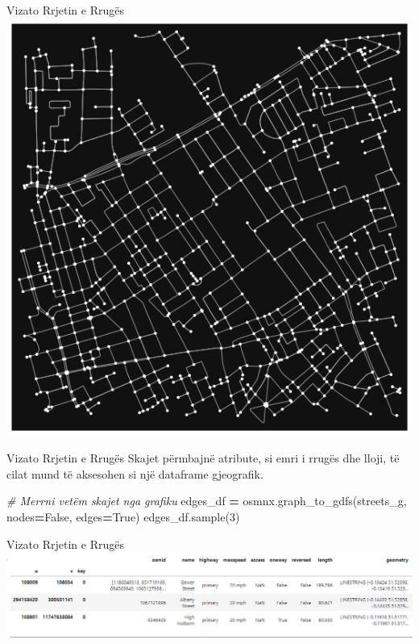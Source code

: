\documentclass[
  ignorenonframetext,
]{beamer}
\newenvironment{Shaded}{\begin{snugshade}}{\end{snugshade}}
\newcommand{\CommentTok}[1]{\textcolor[rgb]{0.56,0.35,0.01}{\textit{#1}}}
\newcommand{\DecValTok}[1]{\textcolor[rgb]{0.00,0.00,0.81}{#1}}
\newcommand{\NormalTok}[1]{#1}
\newcommand{\OperatorTok}[1]{\textcolor[rgb]{0.81,0.36,0.00}{\textbf{#1}}}
\newcommand{\VariableTok}[1]{\textcolor[rgb]{0.00,0.00,0.00}{#1}}
\begin{document}
\begin{frame}{Vizato Rrjetin e Rrugës}
\protect\hypertarget{vizato-rrjetin-e-rruguxebs-3}{}
\includegraphics{./Figs/osmx1.png}
\end{frame}

\begin{frame}[fragile]{Vizato Rrjetin e Rrugës}
\protect\hypertarget{vizato-rrjetin-e-rruguxebs-4}{}
Skajet përmbajnë atribute, si emri i rrugës dhe lloji, të cilat mund të
aksesohen si një dataframe gjeografik.


\begin{Shaded}
\begin{Highlighting}[]
\CommentTok{\# Merrni vetëm skajet nga grafiku}
\NormalTok{edges\_df }\OperatorTok{=}\NormalTok{ osmnx.graph\_to\_gdfs(streets\_g, nodes}\OperatorTok{=}\VariableTok{False}\NormalTok{, edges}\OperatorTok{=}\VariableTok{True}\NormalTok{)}
\NormalTok{edges\_df.sample(}\DecValTok{3}\NormalTok{)}
\end{Highlighting}
\end{Shaded}
\end{frame}

\begin{frame}{Vizato Rrjetin e Rrugës}
\protect\hypertarget{vizato-rrjetin-e-rruguxebs-5}{}
\includegraphics{./Figs/rrjetirrugor.png}
\end{frame}
\end{document}
